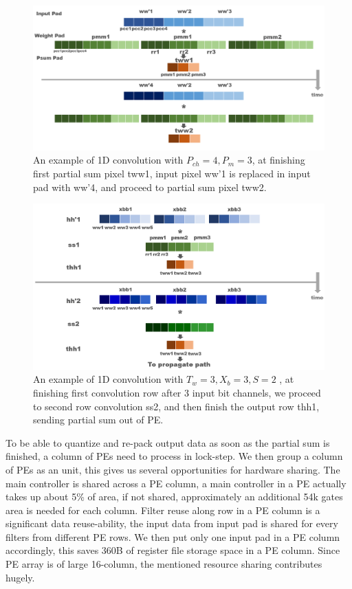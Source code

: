 \begin{figure}
    \centering
    \includegraphics[width=1\linewidth]{inc/4_proposed_architecture/figure/tww.png}
    \caption{An example of 1D convolution with $P_{ch}=4,P_m=3$, at finishing first partial sum pixel tww1, input pixel ww'1 is replaced in input pad with ww'4, and proceed to partial sum pixel tww2. }
    \label{fig:tww}
\end{figure}
\begin{figure}
    \centering
    \includegraphics[width=1\linewidth]{inc/4_proposed_architecture/figure/xb_to_s.png}
    \caption{An example of 1D convolution with $T_w=3,X_b=3,S=2$ , at finishing first convolution row after 3 input bit channels, we proceed to second row convolution ss2, and then finish the output row thh1, sending partial sum out of PE.}
    \label{fig:xb_to_s}
\end{figure}
To be able to quantize and re-pack output data as soon as the partial sum is finished, a column of PEs need to process in lock-step. We then group a column of PEs as an unit, this gives us several opportunities for hardware sharing. The main controller is shared across a PE column, a main controller in a PE actually takes up about 5\% of area, if not shared, approximately an additional 54k gates area is needed for each column. Filter reuse along row in a PE column is a significant data reuse-ability, the input data from input pad is shared for every filters from different PE rows. We then put only one input pad in a PE column accordingly, this saves 360B of register file storage space in a PE column. Since PE array is of large 16-column, the mentioned resource sharing contributes hugely. 

